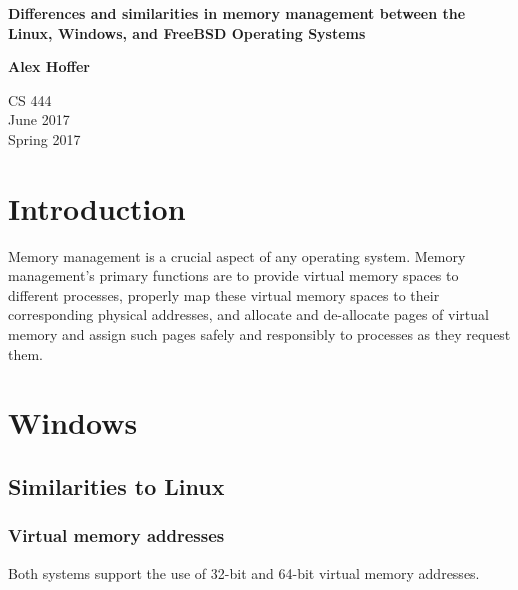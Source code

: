\documentclass[letterpaper,10pt,titlepage]{article}
\begin{document}
\begin{titlepage}
    \begin{center}
        \vspace*{3.5cm}

        \textbf{Differences and similarities in memory management between the Linux, Windows, and FreeBSD Operating Systems}

        \vspace{0.5cm}

        \textbf{Alex Hoffer}

        \vspace{0.8cm}

        CS 444\\
        June 2017\\
	Spring 2017\\

        \vfill

    \end{center}
\end{titlepage}

\newpage

\tableofcontents

\newpage

\section{Introduction}
Memory management is a crucial aspect of any operating system. Memory management's primary functions are to provide virtual memory spaces to different processes, properly map these virtual memory spaces to their corresponding physical addresses, and allocate and de-allocate pages of virtual memory and assign such pages safely and responsibly to processes as they request them.

\section{Windows}
\subsection{Similarities to Linux}
\subsubsection{Virtual memory addresses}
Both systems support the use of 32-bit and 64-bit virtual memory addresses. \cite{windows1} \cite{linux1}
\end{document}
